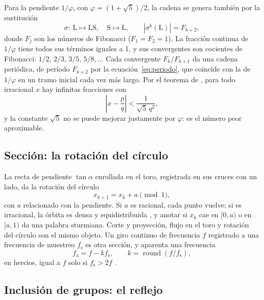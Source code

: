 \documentclass[11pt,a4paper]{article}
\begin{document}
Para la pendiente $1/\varphi$, con $\varphi = (1+\sqrt5)/2$, la cadena se genera también por la sustitución
\begin{equation}\label{eq:sustitucion}
\sigma:\ \mathrm L \mapsto \mathrm{LS}, \quad \mathrm S \mapsto \mathrm L, \qquad |\sigma^k(\mathrm L)| = F_{k+2},
\end{equation}
donde $F_j$ son los números de Fibonacci ($F_1 = F_2 = 1$). La fracción continua de $1/\varphi$ tiene todos sus términos iguales a 1, y sus convergentes son cocientes de Fibonacci: $1/2$, $2/3$, $3/5$, $5/8, \dots$ Cada convergente $F_k/F_{k+1}$ da una cadena periódica, de período $F_{k+2}$ por la ecuación~\eqref{eq:periodo}, que coincide con la de $1/\varphi$ en un tramo inicial cada vez más largo. Por el teorema de \textcite{hurwitz1891}, para todo irracional $x$ hay infinitas fracciones con
\begin{equation}\label{eq:hurwitz}
\left| x - \frac{p}{q} \right| < \frac{1}{\sqrt5\, q^2},
\end{equation}
y la constante $\sqrt5$ no se puede mejorar justamente por $\varphi$: es el número peor aproximable.

\subsection{Sección: la rotación del círculo}

La recta de pendiente $\tan\alpha$ enrollada en el toro, registrada en sus cruces con un lado, da la rotación del círculo
\begin{equation}\label{eq:rotacion}
x_{k+1} = x_k + a \pmod 1 ,
\end{equation}
con $a$ relacionado con la pendiente. Si $a$ es racional, cada punto vuelve; si es irracional, la órbita es densa y equidistribuida \parencite{weyl1916}, y anotar si $x_k$ cae en $[0, a)$ o en $[a, 1)$ da una palabra sturmiana. Corte y proyección, flujo en el toro y rotación del círculo son el mismo objeto. Un giro continuo de frecuencia $f$ registrado a una frecuencia de muestreo $f_{\mathrm s}$ es otra sección, y aparenta una frecuencia
\begin{equation}\label{eq:alias}
f_{\mathrm a} = f - k f_{\mathrm s}, \qquad k = \operatorname{round}(f/f_{\mathrm s}),
\end{equation}
en hercios, igual a $f$ solo si $f_{\mathrm s} > 2f$ \parencite{nyquist1928,shannon1949}.

\subsection{Inclusión de grupos: el reflejo}
\end{document}
